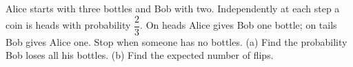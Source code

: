 Alice starts with three bottles and Bob with two. Independently at each step a coin is heads with probability $\dfrac{2}{3}$. On heads Alice gives Bob one bottle; on tails Bob gives Alice one. Stop when someone has no bottles. (a) Find the probability Bob loses all his bottles. (b) Find the expected number of flips.
